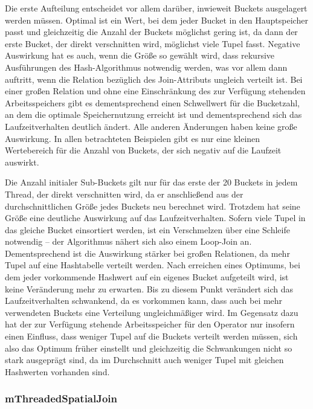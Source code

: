 \documentclass[a4paper,12pt,twoside]{article}
\begin{document}
Die erste Aufteilung entscheidet vor allem darüber, inwieweit Buckets ausgelagert werden müssen. Optimal ist ein Wert, bei dem jeder Bucket in den Hauptspeicher passt und gleichzeitig die Anzahl der Buckets möglichst gering ist, da dann der erste Bucket, der direkt verschnitten wird, möglichst viele Tupel fasst. Negative Auswirkung hat es auch, wenn die Größe so gewählt wird, dass rekursive Ausführungen des Hash-Algorithmus notwendig werden, was vor allem dann auftritt, wenn die Relation bezüglich des Join-Attributs ungleich verteilt ist. Bei einer großen Relation und ohne eine Einschränkung des zur Verfügung stehenden Arbeitsspeichers gibt es dementsprechend einen Schwellwert für die Bucketzahl, an dem die optimale Speichernutzung erreicht ist und dementsprechend sich das Laufzeitverhalten deutlich ändert. Alle anderen Änderungen haben keine große Auswirkung. In allen betrachteten Beispielen gibt es nur eine kleinen Wertebereich für die Anzahl von Buckets, der sich negativ auf die Laufzeit auswirkt.

Die Anzahl initialer Sub-Buckets gilt nur für das erste der 20 Buckets in jedem Thread, der direkt verschnitten wird, da er anschließend aus der durchschnittlichen Größe jedes Buckets neu berechnet wird. Trotzdem hat seine Größe eine deutliche Auswirkung auf das Laufzeitverhalten. Sofern viele Tupel in das gleiche Bucket einsortiert werden, ist ein Verschmelzen über eine Schleife notwendig -- der Algorithmus nähert sich also einem Loop-Join an. Dementsprechend ist die Auswirkung stärker bei großen Relationen, da mehr Tupel auf eine Hashtabelle verteilt werden. Nach erreichen eines Optimums, bei dem jeder vorkommende Hashwert auf ein eigenes Bucket aufgeteilt wird, ist keine Veränderung mehr zu erwarten. Bis zu diesem Punkt verändert sich das Laufzeitverhalten schwankend, da es vorkommen kann, dass auch bei mehr verwendeten Buckets eine Verteilung ungleichmäßiger wird. Im Gegensatz dazu hat der zur Verfügung stehende Arbeitsspeicher für den Operator nur insofern einen Einfluss, dass weniger Tupel auf die Buckets verteilt werden müssen, sich also das Optimum früher einstellt und gleichzeitig die Schwankungen nicht so stark ausgeprägt sind, da im Durchschnitt auch weniger Tupel mit gleichen Hashwerten vorhanden sind.

\subsubsection{mThreadedSpatialJoin}
\label{exp:sj}
\end{document}
